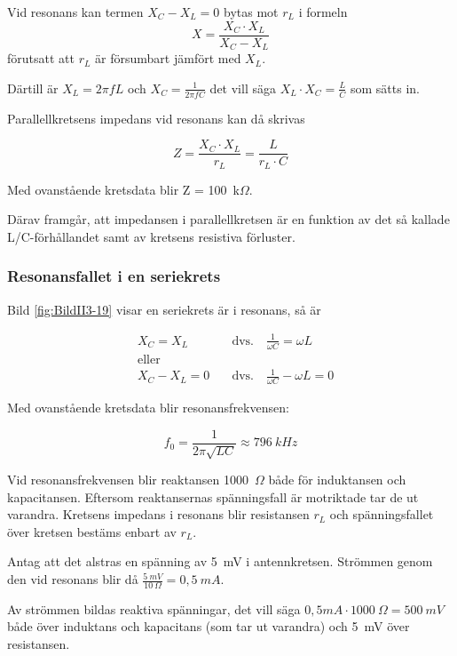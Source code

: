 Vid resonans kan termen \(X_C - X_L = 0\) bytas mot \(r_L\) i formeln
\[X = \frac{X_C \cdot X_L}{X_C - X_L}\] förutsatt att \(r_L\) är försumbart
jämfört med \(X_L\).

Därtill är \(X_L = 2\pi fL\) och \(X_C = \frac{1}{2\pi fC}\) det vill säga
\(X_L \cdot X_C = \frac{L}{C}\) som sätts in.

Parallellkretsens impedans vid resonans kan då skrivas

\[
Z = \frac{X_C \cdot X_L}{r_L} = \frac{L}{r_L \cdot C}
\]

Med ovanstående kretsdata blir Z = 100~k\(\Omega\).

Därav framgår, att impedansen i parallellkretsen är en funktion av det så
kallade L/C-förhållandet samt av kretsens resistiva förluster.

\subsubsection{Resonansfallet i en seriekrets}
\label{serieresonans}


Bild \ref{fig:BildII3-19} visar en seriekrets är i resonans, så är

\begin{align*}
& X_C = X_L \quad & \text{dvs.} \quad \frac{1}{\omega C} = \omega L\\
& \text{eller} & \\
& X_C - X_L = 0 \quad & \text{dvs.} \quad \frac{1}{\omega C} - \omega L = 0
\end{align*}

Med ovanstående kretsdata blir resonansfrekvensen:

\[
f_0 = \frac{1}{2\pi \sqrt{LC}} \approx 796\ kHz
\]

Vid resonansfrekvensen blir reaktansen 1000~\(\Omega\) både för induktansen och
kapacitansen.
Eftersom reaktansernas spänningsfall är motriktade tar de ut varandra.
Kretsens impedans i resonans blir resistansen \(r_L\) och
spänningsfallet över kretsen bestäms enbart av \(r_L\).

Antag att det alstras en spänning av 5~mV i antennkretsen.
Strömmen genom den vid resonans blir då \(\frac{5\ mV}{10\ \Omega} = 0,5\ mA\).

Av strömmen bildas reaktiva spänningar, det vill säga
\(0,5 mA \cdot 1000\ \Omega = 500\ mV\) både över induktans och kapacitans
(som tar ut varandra) och 5~mV över resistansen.

